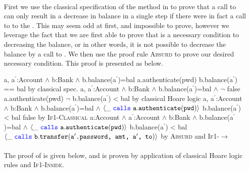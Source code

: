 \paragraph{\emph{\textbf{}}}First we use the classical specification of the  method in  to prove that a call to  can only result in 
a decrease in balance in a single step if there were in fact a call to  to the . This may seem 
odd at first, and impossible to prove, however we leverage the fact that we are first able to prove that 
is a necessary condition to decreasing the balance, or in other words, it is not possible to decrease the balance by a
call to . We then use the proof rule \textsc{Absurd} to prove our desired necessary condition.
This proof is presented as  below.
\\
\noindent
{
	\begin{proofexample}
			{\proofstepwithrule
				{\hoareEx
						{a, a$^\prime$:Account $\wedge$ b:Bank $\wedge$ b.balance(a$^\prime$)=bal}
						{a.authenticate(pwd)}
						{b.balance(a$^\prime$) == bal}
						}
					{by classical spec.}
			}
			{\proofstepwithrule
				{\hoareEx
						{a, a$^\prime$:Account $\wedge$ b:Bank $\wedge$ b.balance(a$^\prime$)=bal $\wedge$ $\neg$ false}
						{a.authenticate(pwd)}
						{$\neg$ b.balance(a$^\prime$) < bal}
						}
					{by classical Hoare logic}
			}
			{\proofstepwithrule
				{\onlyIfSingleExAlt
						{a, a$^\prime$:Account $\wedge$ b:Bank $\wedge$ b.balance(a$^\prime$)=bal $\wedge$ $\langle \_\ {\color{blue}\texttt{calls}}\ {\texttt{a}}.{\texttt{authenticate}}({\texttt{pwd}}) \rangle$}
						{b.balance(a$^\prime$) < bal}
						{false}
						}
					{by \textsc{If1-Classical}}
			}
			{\proofstepwithrule
				{\onlyIfSingleExAlt
						{a:Account $\wedge$ a$^\prime$:Account $\wedge$ b:Bank $\wedge$ b.balance(a$^\prime$)=bal $\wedge$ $\langle \_\ {\color{blue}\texttt{calls}}\ {\texttt{a}}.{\texttt{authenticate}}({\texttt{pwd}}) \rangle$}
						{b.balance(a$^\prime$) < bal}
						{$\langle \_\ {\color{blue}\texttt{calls}}\ {\texttt{b}}.{\texttt{transfer}}({\texttt{a$^\prime$.password, amt, a$^\prime$, to}}) \rangle$}
						}
					{by \textsc{Absurd} and \textsc{If1-}$\longrightarrow$}
			}
		\endproofsteps
	\end{proofexample}
}

\paragraph{\emph{\textbf{}}} The proof of  is given below, and is proven by application of classical Hoare logic rules and \textsc{If1-Inside}.

